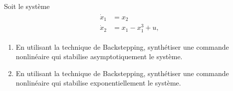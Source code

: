 \begin{exercise}
	Soit le système 
	\begin{align}
	\begin{split}
	\dot{x}_1 &= x_2\\
	\dot{x}_2 &= x_1 - x_1^3 +u,
	\end{split}
	\end{align}
	\begin{enumerate}
		\item En utilisant la technique de Backstepping, synthétiser une commande nonlinéaire qui stabilise asymptotiquement le système.
		\item En utilisant la technique de Backstepping, synthétiser une commande nonlinéaire qui stabilise exponentiellement le système.
	\end{enumerate}
\end{exercise}